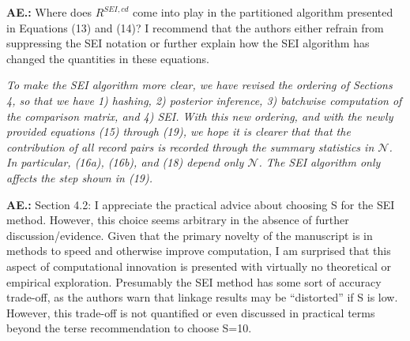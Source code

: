 \documentclass[letterpaper, parskip]{scrartcl}
\newcommand{\pointRaised}[2]{%
	\textbf{#1.\theresponsectr:} #2
}
\newcounter{responsectr}[section]     %
\newcommand{\reply}[1]{%
	\refstepcounter{responsectr}%
		\begin{tcolorbox}
			\itshape #1
		\end{tcolorbox}
}
\begin{document}




\pointRaised{AE}{%
	Where does $R^{SEI, cd}$ come into play in the partitioned algorithm presented in Equations (13) and (14)? I recommend that the authors either refrain from suppressing the SEI notation or further explain how the SEI algorithm has changed the quantities in these equations.}
	
\reply{To make the SEI algorithm more clear, we have revised the ordering of Sections 4, so that we have 1) hashing, 2) posterior inference, 3) batchwise computation of the comparison matrix, and 4) SEI. With this new ordering, and with the newly provided equations (15) through (19), we hope it is clearer that that the contribution of \emph{all} record pairs is recorded through the summary statistics in $\mathcal{N}$. In particular, (16a), (16b), and (18) depend only $\mathcal{N}$. The SEI algorithm only affects the step shown in (19). 
	}
	
	



\pointRaised{AE}{%
	Section 4.2: I appreciate the practical advice about choosing S for the SEI method. However, this choice seems arbitrary in the absence of further discussion/evidence. Given that the primary novelty of the manuscript is in methods to speed and otherwise improve computation, I am surprised that this aspect of computational innovation is presented with virtually no theoretical or empirical exploration. Presumably the SEI method has some sort of accuracy trade-off, as the authors warn that linkage results may be “distorted” if S is low. However, this trade-off is not quantified or even discussed in practical terms beyond the terse recommendation to choose S=10.
}
\end{document}
